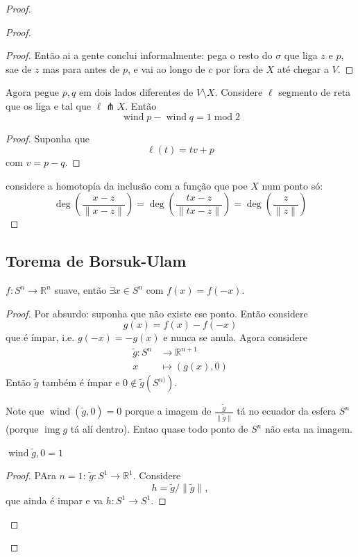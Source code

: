 \begin{proof}
\begin{proof}
\begin{proof}
	Então ai a gente conclui informalmente: pega o resto do \(\sigma\) que liga \(z\) e \(p\), sae de \(z\) mas para antes de \(p\), e vai ao longo de \( c\) por fora de \(X\) até chegar a \(V\).
	\end{proof}
\begin{claim}\leavevmode
	Agora pegue \(p,q\) em dois lados diferentes de \(V\setminus X\). Considere \(\ell\) segmento de reta que os liga e tal que \(\ell \pitchfork  X\). Então 
	\[\operatorname{wind}p-\operatorname{wind}q=1 \operatorname{mod} 2\]
\end{claim}
\begin{proof}\leavevmode
Suponha que
 \[\ell(t)=tv+p\]
com \(v=p-q\).
\end{proof}

considere a homotopía da inclusão com a função que poe \(X\) num ponto só:
\[\operatorname{deg}\left(\frac{x-z}{\|x-z\|}\right) =\operatorname{deg}\left(\frac{t x -z}{\|t x -z\|}\right) =\operatorname{deg}\left(\frac{z}{\|z\|}\right) \]
\end{proof}

\subsection{Torema de Borsuk-Ulam}

\begin{thm}\leavevmode
\(f : S^n \to \mathbb{R}^n\) suave, então \(\exists  x \in S^{n}\) com \(f(x)=f(-x)\).
\end{thm}

\begin{proof}\leavevmode
Por absurdo: suponha que não existe ese ponto. Então considere
\[g(x)=f(x)-f(-x)\]
que é ímpar, i.e. \(g(-x)=-g(x)\) e nunca se anula. Agora considere
\begin{align*}
	\tilde{g}: S^{n} &\longrightarrow \mathbb{R}^{n+1} \\
	x &\longmapsto (g(x),0)
\end{align*}
Então \(\tilde{g}\) também é ímpar e \(0 \not \in \tilde{g}(S^{n)})\).

Note que \(\operatorname{wind}(\tilde{g},0)=0\) porque a imagem de \(\frac{\tilde{g}}{\|\tilde{g}\|}\) tá no ecuador da esfera \(S^n\) (porque \(\operatorname{img}g\) tá alí dentro). Entao quase todo ponto de \(S^{n}\) não esta na imagem.

\begin{claim}\leavevmode
\(\operatorname{wind}\tilde{g},0=1\)
\end{claim}
\begin{proof}\leavevmode
PAra \(n=1\): \(\tilde{g}:S^1\to \mathbb{R}^1\). Considere
\[h=\tilde{g}/\|\tilde{g}\|,\]
que ainda é impar e va \(h:S^1 \to S^1\).


\end{proof}
\end{proof}
\end{proof}
